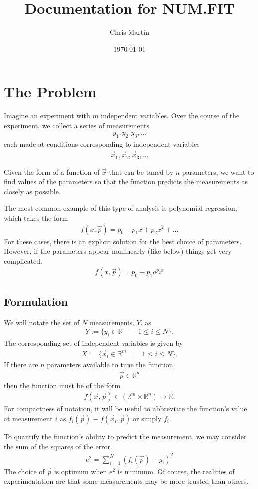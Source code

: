 \documentclass{article}
\title{Documentation for NUM.FIT}
\author{Chris Martin}
\date{\today}
\def\x{\vec{x}}
\def\p{\vec{p}}
\def\R{\mathbb{R}}
\begin{document}
\maketitle

\section{The Problem}
Imagine an experiment with $m$ independent variables.  Over the course of the experiment, we collect a series of measurements
\begin{align}
y_1, y_2, y_3, \ldots\nonumber
\end{align}
each made at conditions corresponding to independent variables
\begin{align}
\x_1, \x_2, \x_3, \ldots\nonumber
\end{align}

Given the form of a function of $\x$ that can be tuned by $n$ parameters, we want to find values of the parameters so that the function predicts the measurements as closely as possible.

The most common example of this type of analysis is polynomial regression, which takes the form
\begin{align}
f(x,\p) = p_0 + p_1 x + p_2 x^2 + \ldots \nonumber
\end{align}
For these cases, there is an explicit solution for the best choice of parameters.  However, if the parameters appear nonlinearly (like below) things get very complicated.
\begin{align}
f(x,\p) = p_0 + p_1 a ^ {p_2 x} \nonumber
\end{align}

\subsection{Formulation}
We will notate the set of $N$ measurements, $Y$, as
\begin{align}
Y:=\{y_i \in \R \quad | \quad 1 \le i \le N\}.
\end{align}
The corresponding set of independent variables is given by
\begin{align}
X := \{\x_i \in \R^m \quad | \quad 1 \le i \le N\}.
\end{align}
If there are $n$ parameters available to tune the function,
\begin{align}
\p \in \R^n
\end{align}
then the function must be of the form
\begin{align}
f(\x,\p) \in (\R^m\times\R^n) \rightarrow \R.
\end{align}
For compactness of notation, it will be useful to abbreviate the function's value at measurement $i$ as $f_i(\p) \equiv f(\x_i,\p)$ or simply $f_i$.

To quantify the function's ability to predict the measurement, we may consider the sum of the squares of the error.
\begin{align}
e^2 = \sum_{i=1}^N (f_i(\p) - y_i)^2
\end{align}
The choice of $\p$ is optimum when $e^2$ is minimum.  Of course, the realities of experimentation are that some measurements may be more trusted than others.
\end{document}
